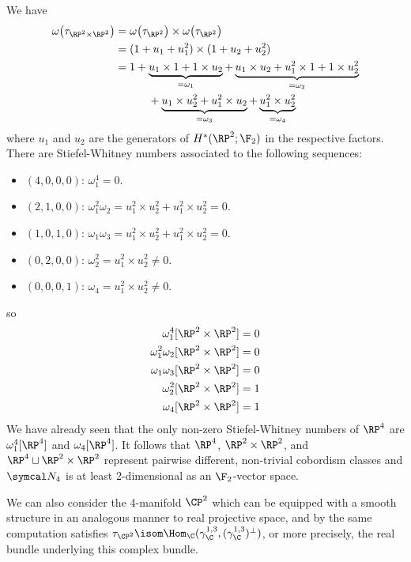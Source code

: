 \begin{example}
	We have
	\begin{align*}
		\omega\big(\tau_{\RP^2 \times \RP^2}\big) &= \omega\big(\tau_{\RP^2}\big) \times \omega\big(\tau_{\RP^2}\big) \\
												  &= (1 + u_1 + u_1^2) \times (1 + u_2 + u_2^2) \\
												  &= 1 + \underbrace{u_1 \times 1 + 1 \times u_2}_{= \omega_1} + \underbrace{u_1 \times u_2 + u_1^2 \times 1 + 1 \times u_2^2}_{= \omega_2} \\ 
												  &\qquad\quad + \underbrace{u_1 \times u_2^2 + u_1^2 \times u_2}_{= \omega_3} + \underbrace{u_1^2 \times u_2^2}_{= \omega_4}
	\end{align*}
	where $u_1$ and $u_2$ are the generators of $H^*(\RP^2; \F_2)$ in the respective factors.
	There are Stiefel-Whitney numbers associated to the following sequences:
	\begin{itemize}
		\item $(4, 0, 0 ,0)$: $\omega_1^4 = 0$.
		\item $(2, 1, 0 ,0)$: $\omega_1^2 \omega_2 = u_1^2 \times u_2^2 + u_1^2 \times u_2^2 = 0 $.
		\item $(1, 0, 1 ,0)$: $\omega_1 \omega_3 = u_1^2 \times u_2^2 + u_1^2 \times u_2^2 = 0 $.
		\item $(0, 2, 0 ,0)$: $\omega_2^2 = u_1^2 \times u_2^2 \neq 0 $.
		\item $(0, 0, 0 ,1)$: $\omega_4 = u_1^2 \times u_2^2 \neq 0 $.
	\end{itemize}
	so
	\begin{align*}
		\omega_1^4[\RP^2 \times \RP^2] &= 0 \\
		\omega_1^2 \omega_2[\RP^2 \times \RP^2] &= 0 \\
		\omega_1 \omega_3[\RP^2 \times \RP^2] &= 0 \\
		\omega_2^2[\RP^2 \times \RP^2] &= 1 \\
		\omega_4[\RP^2 \times \RP^2] &= 1
	\end{align*}
	We have already seen that the only non-zero Stiefel-Whitney numbers of $\RP^4$ are $\omega_1^4[\RP^4]$ and $\omega_4[\RP^4]$.
	It follows that $\RP^4$, $\RP^2 \times \RP^2$, and $\RP^4 \sqcup \RP^2 \times \RP^2$ represent pairwise different, non-trivial cobordism classes and $\Bord_4$ is at least 2-dimensional as an $\F_2$-vector space.
\end{example}
We can also consider the 4-manifold $\CP^2$ which can be equipped with a smooth structure in an analogous manner to real projective space, and by the same computation satisfies $\tau_{\CP^2} \isom \Hom_\C(\gamma_\C^{1, 3}, (\gamma_\C^{1, 3})^\perp)$, or more precisely, the real bundle underlying this complex bundle.
